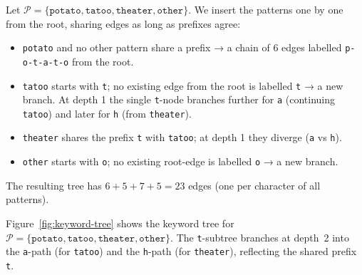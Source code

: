 \begin{example}\label{ex:keyword-tree}
  Let $\mathcal{P} = \{\texttt{potato},\allowbreak\texttt{tatoo},\allowbreak\texttt{theater},\allowbreak\texttt{other}\}$.
  We insert the patterns one by one from the root, sharing edges as long as
  prefixes agree:
  \begin{itemize}[noitemsep, topsep=2pt]
    \item \texttt{potato} and no other pattern share a prefix → a chain of
          6 edges labelled \texttt{p-o-t-a-t-o} from the root.
    \item \texttt{tatoo} starts with \texttt{t}; no existing edge from the
          root is labelled \texttt{t} → a new branch. At depth 1 the single
          \texttt{t}-node branches further for \texttt{a} (continuing
          \texttt{tatoo}) and later for \texttt{h} (from \texttt{theater}).
    \item \texttt{theater} shares the prefix \texttt{t} with \texttt{tatoo};
          at depth 1 they diverge (\texttt{a} vs \texttt{h}).
    \item \texttt{other} starts with \texttt{o}; no existing root-edge is
          labelled \texttt{o} → a new branch.
  \end{itemize}
  The resulting tree has $6{+}5{+}7{+}5 = 23$ edges (one per character of all patterns).
\end{example}

Figure~\ref{fig:keyword-tree} shows the keyword tree for
$\mathcal{P} = \{\texttt{potato},\allowbreak\texttt{tatoo},\allowbreak
\texttt{theater},\allowbreak\texttt{other}\}$.
The \texttt{t}-subtree branches at depth~2 into the \texttt{a}-path
(for \texttt{tatoo}) and the \texttt{h}-path (for \texttt{theater}),
reflecting the shared prefix \texttt{t}.

